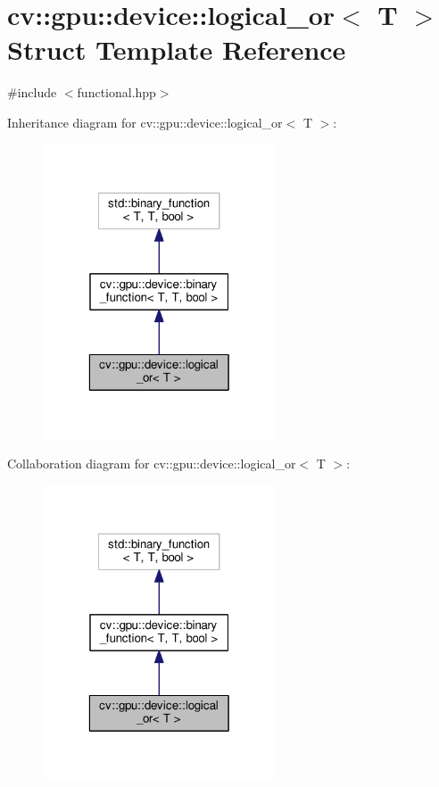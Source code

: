 \hypertarget{structcv_1_1gpu_1_1device_1_1logical__or}{\section{cv\-:\-:gpu\-:\-:device\-:\-:logical\-\_\-or$<$ T $>$ Struct Template Reference}
\label{structcv_1_1gpu_1_1device_1_1logical__or}
}


{\ttfamily \#include $<$functional.\-hpp$>$}



Inheritance diagram for cv\-:\-:gpu\-:\-:device\-:\-:logical\-\_\-or$<$ T $>$\-:\nopagebreak
\begin{figure}[H]
\begin{center}
\leavevmode
\includegraphics[width=196pt]{structcv_1_1gpu_1_1device_1_1logical__or__inherit__graph}
\end{center}
\end{figure}


Collaboration diagram for cv\-:\-:gpu\-:\-:device\-:\-:logical\-\_\-or$<$ T $>$\-:\nopagebreak
\begin{figure}[H]
\begin{center}
\leavevmode
\includegraphics[width=196pt]{structcv_1_1gpu_1_1device_1_1logical__or__coll__graph}
\end{center}
\end{figure}
